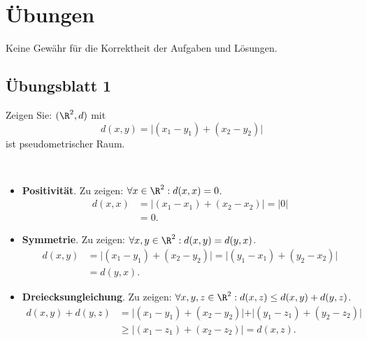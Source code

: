 \chapter{Übungen}

Keine Gewähr für die Korrektheit der Aufgaben und Lösungen.

\section{Übungsblatt 1}
\setcounter{problemcounter}{0}

\begin{assignment}
  Zeigen Sie: \( (\R^2, d) \) mit
  \begin{equation*}
    d(x,y) = \vert (x_1-y_1)+(x_2-y_2) \vert
  \end{equation*}
  ist pseudometrischer Raum.
\end{assignment}
\begin{solution}
  \
  \begin{itemize}
    \item \textbf{Positivität}. Zu zeigen: \( \forall x \in \R^2: d(x,x) = 0 \).
    \begin{align*}
      d(x,x) &= \vert (x_1-x_1)+(x_2-x_2) \vert = \vert 0 \vert \\
      &= 0\text{.}
    \end{align*}
    
    \item \textbf{Symmetrie}. Zu zeigen: \( \forall x, y \in \R^2: d(x,y) = d(y,x) \).
    \begin{align*}
      d(x,y) &= \vert (x_1-y_1)+(x_2-y_2) \vert = \vert (y_1-x_1)+(y_2-x_2) \vert \\
      &= d(y,x)\text{.}
    \end{align*}
    
    \item \textbf{Dreiecksungleichung}. Zu zeigen: \( \forall x,y,z \in \R^2: d(x,z) \leq d(x,y) + d(y,z) \).
    \begin{align*}
      d(x,y) + d(y,z) &= \vert (x_1-y_1)+(x_2-y_2) \vert + \vert (y_1-z_1)+(y_2-z_2) \vert \\
      &\geq \vert (x_1-z_1) + (x_2 - z_2) \vert = d(x,z)\text{.}
    \end{align*}
  \end{itemize}
\end{solution}

